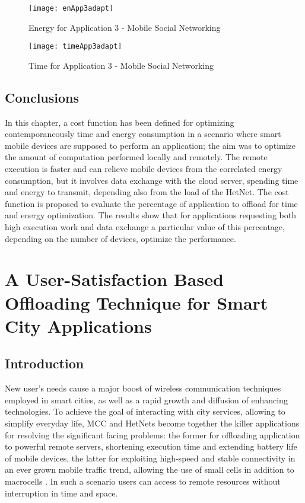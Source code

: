 \documentclass[twoside,openright]{report}
\begin{document}
\begin{figure}[tbp]
\centering
\texttt{[image: enApp3adapt]}
\caption{Energy for Application 3 - Mobile Social Networking}
\label{fig:enApp3adapt}
\end{figure}

\begin{figure}[tbp]
\centering
\texttt{[image: timeApp3adapt]}
\caption{Time for Application 3 - Mobile Social Networking}
\label{fig:timeApp3adapt}
\end{figure}

\section{Conclusions}
In this chapter, a cost function has been defined for optimizing contemporaneously time and energy consumption in a scenario where smart mobile devices are supposed to perform an application; the aim was to optimize the amount of computation performed locally and remotely. 
The remote execution is faster and can relieve mobile devices from the correlated energy consumption, but it involves data exchange with the cloud server, spending time and energy to transmit, depending also from the load of the \gls{HetNet}. 
The cost function is proposed to evaluate the percentage of application to offload for time and energy optimization. 
The results show that for applications requesting both high execution work and data exchange a particular value of this percentage, depending on the number of devices, optimize the performance.  

\chapter[A User-Satisfaction Based Offloading Technique]{A User-Satisfaction Based Offloading Technique for Smart City Applications}
\label{chap:GLOBECOM14}

\section{Introduction}
New user's needs cause a major boost of wireless communication techniques employed in smart cities, as well as a rapid growth and diffusion of enhancing technologies.
To achieve the goal of interacting with city services, allowing to simplify everyday life, \gls{MCC} and \glspl{HetNet} become together the killer applications for resolving the significant facing problems: the former for offloading application to powerful remote servers, shortening execution time and extending battery life of mobile devices, the latter for exploiting high-speed and stable connectivity in an ever grown mobile traffic trend, allowing the use of small cells in addition to macrocells \cite{Challenges}.
In such a scenario users can access to remote resources without interruption in time and space.
\end{document}
